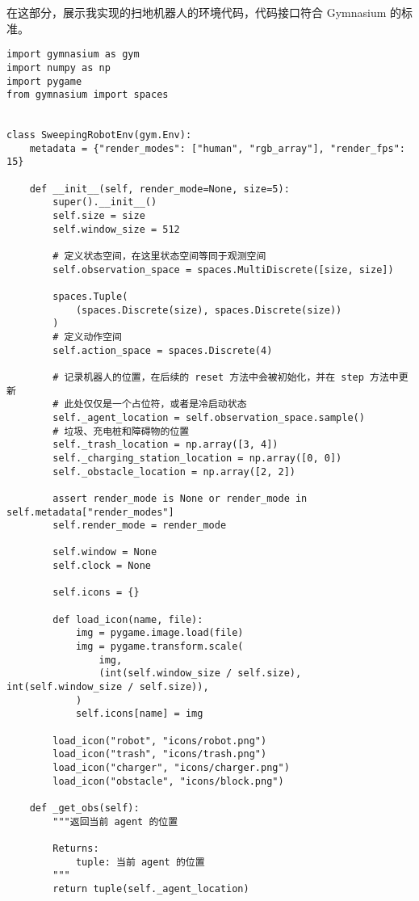 在这部分，展示我实现的扫地机器人的环境代码，代码接口符合 Gymnasium 的标准。

\begin{verbatim}
import gymnasium as gym
import numpy as np
import pygame
from gymnasium import spaces


class SweepingRobotEnv(gym.Env):
    metadata = {"render_modes": ["human", "rgb_array"], "render_fps": 15}

    def __init__(self, render_mode=None, size=5):
        super().__init__()
        self.size = size
        self.window_size = 512

        # 定义状态空间，在这里状态空间等同于观测空间
        self.observation_space = spaces.MultiDiscrete([size, size])
        
        spaces.Tuple(
            (spaces.Discrete(size), spaces.Discrete(size))
        )
        # 定义动作空间
        self.action_space = spaces.Discrete(4)

        # 记录机器人的位置，在后续的 reset 方法中会被初始化，并在 step 方法中更新
        # 此处仅仅是一个占位符，或者是冷启动状态
        self._agent_location = self.observation_space.sample()
        # 垃圾、充电桩和障碍物的位置
        self._trash_location = np.array([3, 4])
        self._charging_station_location = np.array([0, 0])
        self._obstacle_location = np.array([2, 2])

        assert render_mode is None or render_mode in self.metadata["render_modes"]
        self.render_mode = render_mode

        self.window = None
        self.clock = None

        self.icons = {}

        def load_icon(name, file):
            img = pygame.image.load(file)
            img = pygame.transform.scale(
                img,
                (int(self.window_size / self.size), int(self.window_size / self.size)),
            )
            self.icons[name] = img

        load_icon("robot", "icons/robot.png")
        load_icon("trash", "icons/trash.png")
        load_icon("charger", "icons/charger.png")
        load_icon("obstacle", "icons/block.png")

    def _get_obs(self):
        """返回当前 agent 的位置

        Returns:
            tuple: 当前 agent 的位置
        """
        return tuple(self._agent_location)


\end{verbatim}
